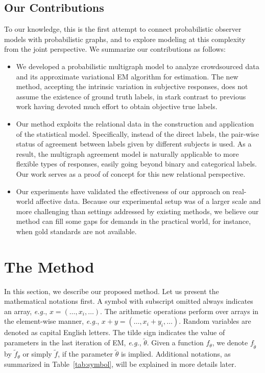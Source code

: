 \documentclass[10pt,journal,letterpaper,compsoc,twoside]{IEEEtran}
\begin{document}

\subsection{Our Contributions}
 To our knowledge, this is the first attempt to connect probabilistic observer models with probabilistic graphs, and to explore modeling at this complexity from the joint perspective. 
 We summarize our contributions as follows:
 \begin{itemize}
\item We developed a probabilistic multigraph model to analyze crowdsourced data and its
approximate variational EM algorithm for estimation. {The new method, accepting the intrinsic variation in subjective responses, does not assume the existence of ground truth labels, in stark contrast to previous work having devoted much effort to obtain objective true labels.}
\item {
Our method exploits the relational data in the construction and application of the statistical model. Specifically, instead of the direct labels, the pair-wise status of agreement between labels given by different subjects is used. As a result, the multigraph agreement model is naturally applicable to more flexible types of responses, easily going beyond binary and categorical labels. Our work serves as a proof of concept for this new relational perspective.}
\item Our experiments have validated the effectiveness of our approach on real-world affective data. Because our experimental setup was of a larger scale and more challenging {than settings  addressed by existing methods, we believe our method can fill some gaps for demands in the practical world, for instance, when gold standards are not available.}
\end{itemize}

\section{The Method}
In this section, we describe our proposed method. Let us present the mathematical notations first. A symbol with subscript omitted always
indicates an array, {\it e.g.}, $x=(\ldots,x_i,\ldots)$. The 
arithmetic operations perform over arrays in
the element-wise manner, {\it e.g.}, $x+y=(\ldots,x_i+y_i,\ldots)$.
Random variables are denoted as capital English letters.
The tilde sign indicates the value of parameters in the last 
iteration of EM, {\it e.g.}, $\tilde{\theta}$.
Given a function $f_{\theta}$, we denote $f_{\tilde{\theta}}$ 
by $\tilde{f}_\theta$ or simply $\tilde{f}$, if the 
parameter $\tilde{\theta}$ is implied. Additional notations, as summarized in Table~\ref{tab:symbol},
will be explained in more details later. 
\end{document}
